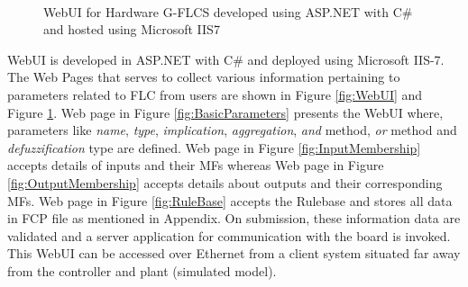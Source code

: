 \begin{figure}
	\centering
	 \\
	\caption{WebUI for Hardware G-FLCS developed using ASP.NET with C\# and hosted using Microsoft IIS7}
	\label{fig:WebUI2}
\end{figure}
\par
WebUI is developed in ASP.NET with C\# and deployed using Microsoft IIS-7. The Web Pages that serves to collect various information pertaining to parameters related to FLC from users are shown in Figure \ref{fig:WebUI} and Figure \ref{fig:WebUI2}. Web page in Figure \ref{fig:BasicParameters} presents the WebUI where, parameters like \textit{name}, \textit{type}, \textit{implication}, \textit{aggregation}, \textit{and} method,\textit{ or} method and \textit{defuzzification} type are defined. Web page in Figure \ref{fig:InputMembership} accepts details of inputs and their MFs whereas Web page in Figure \ref{fig:OutputMembership} accepts details about outputs and their corresponding MFs. Web page in Figure \ref{fig:RuleBase} accepts the Rulebase and stores all data in FCP file as mentioned in Appendix. On submission, these information data are validated and a server application for communication with the board is invoked. This WebUI can be accessed over Ethernet from a client system situated far away from the controller and plant (simulated model).

